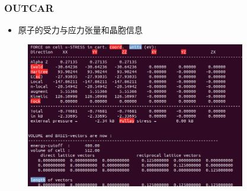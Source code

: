 \frame
{
	\frametitle{\textrm{OUTCAR}}
	\begin{itemize}
	\item 原子的受力与应力张量和晶胞信息
	\end{itemize}
\begin{figure}[h!]
\centering
\includegraphics[height=2.5in,viewport=0 0 780 515,clip]{Figures/VASP_train-OUTCAR-stress_and_volumn.png}
\caption{\fontsize{6.2pt}{5.2pt}}%
\label{VASP_train-OUTCAR-stress_and_volumn}
\end{figure}
}

